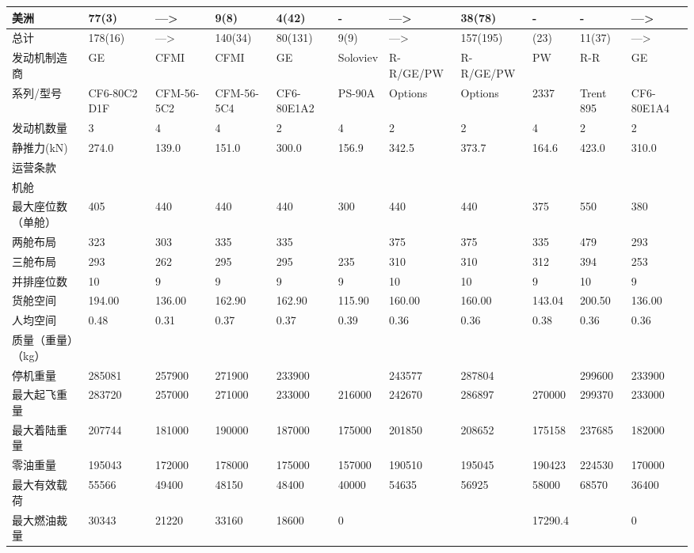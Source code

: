 \documentclass[12pt,a4paper]{report}
\begin{document}
\begin{landscape}
\begin{center}
\begin{longtable}{|p{1.5cm}|p{1.3cm}|p{1.1cm}|p{1.1cm}|p{1.1cm}|p{1.1cm}|p{1.1cm}|p{1.1cm}|p{1.1cm}|p{1.1cm}|p{1.1cm}|}
美洲	&	77(3)	&	--->	&	9(8)	&	4(42)	&	-	&	--->	&	38(78)	&	-	&	-	&	--->\\ \hline
总计	&	178(16)	&	--->	&	140(34)	&	80(131)	&	9(9)	&	--->	&	157(195)	&	(23)	&	11(37)	&	--->\\ \hline
发动机制造商	&	GE	&	CFMI	&	CFMI	&	GE	&	Soloviev	&	R-R/GE/PW	&	R-R/GE/PW	&	PW	&	R-R	&	GE\\ \hline
系列/型号	&	CF6-80C2 D1F	&	CFM-56-5C2	&	CFM-56-5C4	&	CF6-80E1A2	&	PS-90A	&	Options	&	Options	&	2337	&	Trent 895	&	CF6-80E1A4\\ \hline
发动机数量	&	3	&	4	&	4	&	2	&	4	&	2	&	2	&	4	&	2	&	2\\ \hline
静推力(kN)	&	274.0	&	139.0	&	151.0	&	300.0	&	156.9	&	342.5	&	373.7	&	164.6	&	423.0	&	310.0\\ \hline
运营条款	&		&		&		&		&		&		&		&		&		&	\\ \hline
机舱	&		&		&		&		&		&		&		&		&		&	\\ \hline
最大座位数（单舱）	&	405	&	440	&	440	&	440	&	300	&	440	&	440	&	375	&	550	&	380\\ \hline
两舱布局	&	323	&	303	&	335	&	335	&		&	375	&	375	&	335	&	479	&	293\\ \hline
三舱布局	&	293	&	262	&	295	&	295	&	235	&	310	&	310	&	312	&	394	&	253\\ \hline
并排座位数	&	10	&	9	&	9	&	9	&	9	&	10	&	10	&	9	&	10	&	9\\ \hline
货舱空间	&	194.00	&	136.00	&	162.90	&	162.90	&	115.90	&	160.00	&	160.00	&	143.04	&	200.50	&	136.00\\ \hline
人均空间	&	0.48	&	0.31	&	0.37	&	0.37	&	0.39	&	0.36	&	0.36	&	0.38	&	0.36	&	0.36\\ \hline
质量（重量）（kg）	&		&		&		&		&		&		&		&		&		&	\\ \hline
停机重量	&	285081	&	257900	&	271900	&	233900	&		&	243577	&	287804	&		&	299600	&	233900\\ \hline
最大起飞重量	&	283720	&	257000	&	271000	&	233000	&	216000	&	242670	&	286897	&	270000	&	299370	&	233000\\ \hline
最大着陆重量	&	207744	&	181000	&	190000	&	187000	&	175000	&	201850	&	208652	&	175158	&	237685	&	182000 \\ \hline
零油重量	&	195043	&	172000	&	178000	&	175000	&	157000	&	190510	&	195045	&	190423	&	224530	&	170000\\ \hline
最大有效载荷	&	55566	&	49400	&	48150	&	48400	&	40000	&	54635	&	56925	&	58000	&	68570	&	36400\\ \hline
最大燃油裁量	&	30343	&	21220	&	33160	&	18600	&	0	&		&		&	17290.4	&		&	0\\ \hline

\end{longtable}
\end{center}
\end{landscape}
\end{document}
